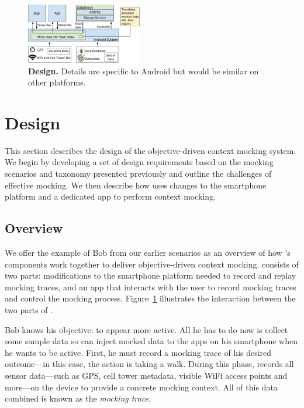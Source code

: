 \begin{figure}[t]
\centering
\includegraphics[width=0.45\textwidth]{./figures/architecture.pdf}

\caption{\textbf{\PocketMocker{} Design.} Details are specific to Android but
would be similar on other platforms.}

\label{fig-design}
\vspace*{-0.2in}
\end{figure}

\section{\PocketMocker{} Design}
\label{sec-design}

This section describes the design of the \PocketMocker{} objective-driven
context mocking system. We begin by developing a set of design requirements
based on the mocking scenarios and taxonomy presented previously and outline
the challenges of effective mocking. We then describe how \PocketMocker{}
uses changes to the smartphone platform and a dedicated app to perform
context mocking.

\subsection{Overview}

We offer the example of Bob from our earlier scenarios as an overview
of how \PocketMocker{}'s components work together to deliver objective-driven
context mocking. \PocketMocker{} consists of two parts:  modifications to the
smartphone platform needed to record and replay mocking traces, and an app
that interacts with the user to record mocking traces and control the mocking
process. Figure~\ref{fig-design} illustrates the interaction between the two
parts of \PocketMocker{}.

Bob knows his objective: to appear more active. All he has to do now is collect
some sample data so \PocketMocker{} can inject mocked data to the apps on his
smartphone when he wants to be active. First, he must record a mocking trace of
his desired outcome---in this case, the action is taking a walk. During this
phase, \PocketMocker{} records all sensor data---such as GPS, cell tower
metadata, visible WiFi access points and more---on the device to provide a
concrete mocking context. All of this data combined is known as the \textit{mocking trace}.

